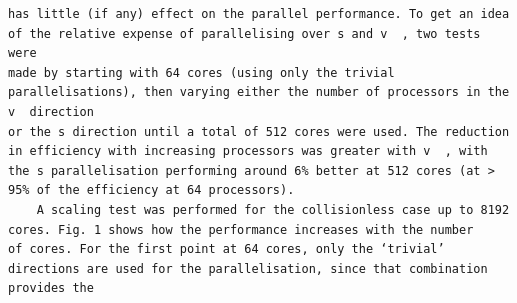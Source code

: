 \documentclass[a4paper]{article}
\newcommand{\gkwpagefont}{\fontsize{6.0pt}{7.55pt}\selectfont}
\begin{document}
\begin{Verbatim}[fontsize=\gkwpagefont]
has little (if any) effect on the parallel performance. To get an idea of the relative expense of parallelising over s and v  , two tests were
made by starting with 64 cores (using only the trivial parallelisations), then varying either the number of processors in the v  direction
or the s direction until a total of 512 cores were used. The reduction in efficiency with increasing processors was greater with v  , with
the s parallelisation performing around 6% better at 512 cores (at > 95% of the efficiency at 64 processors).
    A scaling test was performed for the collisionless case up to 8192 cores. Fig. 1 shows how the performance increases with the number
of cores. For the first point at 64 cores, only the ‘trivial’ directions are used for the parallelisation, since that combination provides the
\end{Verbatim}
\newpage
\end{document}
